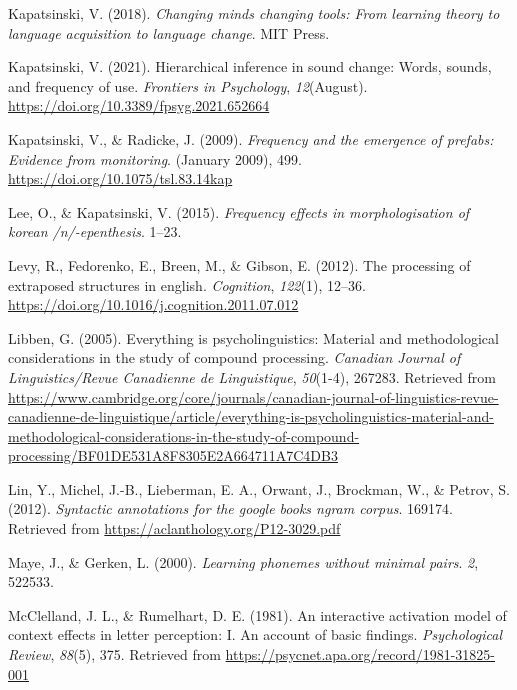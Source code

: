 \documentclass[
  man,floatsintext]{apa6}
\newlength{\cslhangindent}
\newenvironment{CSLReferences}[2] %
 {\begin{list}{}{%
  \setlength{\itemindent}{0pt}
  \setlength{\leftmargin}{0pt}
  \setlength{\parsep}{0pt}
  \ifodd #1
   \setlength{\leftmargin}{\cslhangindent}
   \setlength{\itemindent}{-1\cslhangindent}
  \fi
  \setlength{\itemsep}{#2\baselineskip}}}
 {\end{list}}
\begin{document}
\begin{CSLReferences}{1}{0}
Kapatsinski, V. (2018). \emph{Changing minds changing tools: From learning theory to language acquisition to language change}. MIT Press.

Kapatsinski, V. (2021). Hierarchical inference in sound change: Words, sounds, and frequency of use. \emph{Frontiers in Psychology}, \emph{12}(August). \url{https://doi.org/10.3389/fpsyg.2021.652664}

Kapatsinski, V., \& Radicke, J. (2009). \emph{Frequency and the emergence of prefabs: Evidence from monitoring}. (January 2009), 499. \url{https://doi.org/10.1075/tsl.83.14kap}

Lee, O., \& Kapatsinski, V. (2015). \emph{Frequency effects in morphologisation of korean /n/-epenthesis}. 1--23.

Levy, R., Fedorenko, E., Breen, M., \& Gibson, E. (2012). The processing of extraposed structures in english. \emph{Cognition}, \emph{122}(1), 12--36. \url{https://doi.org/10.1016/j.cognition.2011.07.012}

Libben, G. (2005). Everything is psycholinguistics: Material and methodological considerations in the study of compound processing. \emph{Canadian Journal of Linguistics/Revue Canadienne de Linguistique}, \emph{50}(1-4), 267283. Retrieved from \url{https://www.cambridge.org/core/journals/canadian-journal-of-linguistics-revue-canadienne-de-linguistique/article/everything-is-psycholinguistics-material-and-methodological-considerations-in-the-study-of-compound-processing/BF01DE531A8F8305E2A664711A7C4DB3}

Lin, Y., Michel, J.-B., Lieberman, E. A., Orwant, J., Brockman, W., \& Petrov, S. (2012). \emph{Syntactic annotations for the google books ngram corpus}. 169174. Retrieved from \url{https://aclanthology.org/P12-3029.pdf}

Maye, J., \& Gerken, L. (2000). \emph{Learning phonemes without minimal pairs}. \emph{2}, 522533.

McClelland, J. L., \& Rumelhart, D. E. (1981). An interactive activation model of context effects in letter perception: I. An account of basic findings. \emph{Psychological Review}, \emph{88}(5), 375. Retrieved from \url{https://psycnet.apa.org/record/1981-31825-001}


\end{CSLReferences}
\end{document}
